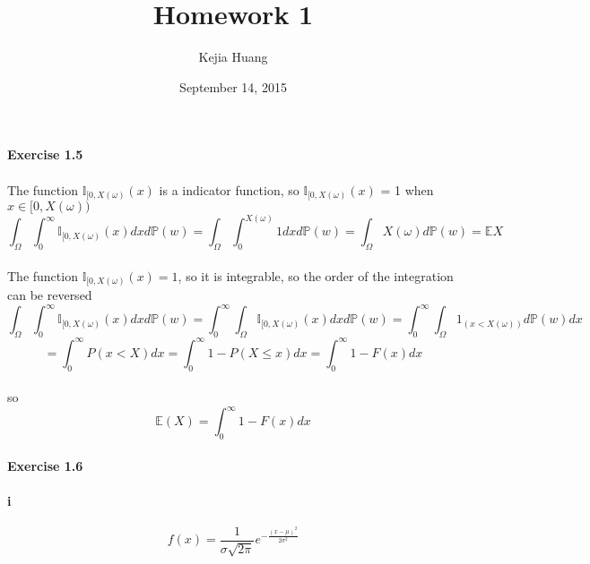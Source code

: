 \documentclass{article}
\begin{document}
\title {Homework 1}
\date {September 14, 2015}
\author{Kejia Huang}
\maketitle


\paragraph{Exercise 1.5}
\paragraph{}{The function $\mathbb{I}_{[0,X(\omega)}(x)$ is a indicator function, so $\mathbb{I}_{[0,X(\omega)}(x)$ = 1 when $x\in [0,X(\omega))$ }
\begin{displaymath}
\int_{\Omega}^{}\int_{0}^{\infty}\mathbb{I}_{[0,X(\omega)}(x)dxd\mathbb{P}(w)=\int_{\Omega}^{}\int_{0}^{X(\omega)}1dxd\mathbb{P}(w)=\int_{\Omega}^{}X(\omega)d\mathbb{P}(w)=\mathbb{E}X
\end{displaymath}
\paragraph{}{The function $\mathbb{I}_{[0,X(\omega)}(x)=1$, so it is integrable, so the order of the integration can be reversed}
\begin{displaymath}
\int_{\Omega}^{}\int_{0}^{\infty}\mathbb{I}_{[0,X(\omega)}(x)dxd\mathbb{P}(w)=\int_{0}^{\infty}\int_{\Omega}^{}\mathbb{I}_{[0,X(\omega)}(x)dxd\mathbb{P}(w)=\int_{0}^{\infty}\int_{\Omega}^{}1_{(x<X(\omega))}d\mathbb{P}(w)dx
\end{displaymath}
\begin{displaymath}
=\int_{0}^{\infty}P(x<X)dx=\int_{0}^{\infty}1-P(X\leq x)dx=\int_{0}^{\infty}1-F(x)dx
\end{displaymath}
\paragraph{}{so\begin{displaymath}
 \mathbb{E}(X)=\int_{0}^{\infty}1-F(x)dx
 \end{displaymath}}


 \paragraph{Exercise 1.6 }
\paragraph{i}
 \begin{displaymath}
 f(x)=\frac{1}{\sigma\sqrt{2\pi}}e^{-\frac{(x-\mu)^{2}}{2\sigma^{2}}}
\end{displaymath}
\end{document}
